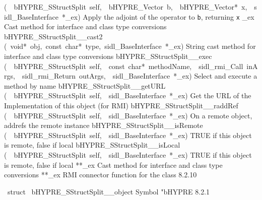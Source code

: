 \documentclass{article}
\begin{document}
\begin{cxxentry}
\begin{cxxentry}
\begin{cxxnames}
        {(\ \ bHYPRE\_SStructSplit\ self,\ \ bHYPRE\_Vector\ b,\ \ bHYPRE\_Vector*\ x,\ \ sidl\_BaseInterface\ *\_ex)}
        {
Apply the adjoint of the operator to {\tt b}, returning {\tt x}}
        {}
\label{cxx.8.2.28}
        {\_ex}
        {}
        {
Cast method for interface and class type conversions}
        {}
\label{cxx.8.2.29}
        {bHYPRE\_SStructSplit\_\_cast2}
        {(\ void*\ obj,\ const\ char*\ type,\ sidl\_BaseInterface\ *\_ex)}
        {
String cast method for interface and class type conversions}
        {}
\label{cxx.8.2.30}
        {bHYPRE\_SStructSplit\_\_exec}
        {(\ \ bHYPRE\_SStructSplit\ self,\ \ const\ char*\ methodName,\ \ sidl\_rmi\_Call\ inArgs,\ \ sidl\_rmi\_Return\ outArgs,\ \ sidl\_BaseInterface\ *\_ex)}
        {
Select and execute a method by name}
        {}
\label{cxx.8.2.31}
        {bHYPRE\_SStructSplit\_\_getURL}
        {(\ \ bHYPRE\_SStructSplit\ self,\ \ sidl\_BaseInterface\ *\_ex)}
        {
Get the URL of the Implementation of this object (for RMI)}
        {}
\label{cxx.8.2.32}
        {bHYPRE\_SStructSplit\_\_raddRef}
        {(\ \ bHYPRE\_SStructSplit\ self,\ \ sidl\_BaseInterface\ *\_ex)}
        {
On a remote object, addrefs the remote instance}
        {}
\label{cxx.8.2.33}
        {bHYPRE\_SStructSplit\_\_isRemote}
        {(\ \ bHYPRE\_SStructSplit\ self,\ \ sidl\_BaseInterface\ *\_ex)}
        {
TRUE if this object is remote, false if local}
        {}
\label{cxx.8.2.34}
        {bHYPRE\_SStructSplit\_\_isLocal}
        {(\ \ bHYPRE\_SStructSplit\ self,\ \ sidl\_BaseInterface\ *\_ex)}
        {
TRUE if this object is remote, false if local}
        {}
\label{cxx.8.2.35}
        {**\_ex}
        {}
        {
Cast method for interface and class type conversions}
        {}
\label{cxx.8.2.36}
        {**\_ex}
        {}
        {
RMI connector function for the class}
        {8.2.10}
\end{cxxnames}
\begin{cxxvariable}
{\ struct\ }
        {bHYPRE\_SStructSplit\_\_object}
        {}
        {
Symbol "bHYPRE}
        {8.2.1}
\begin{cxxdoc}


\end{cxxdoc}
\end{cxxvariable}
\end{cxxentry}
\end{cxxentry}
\end{document}
